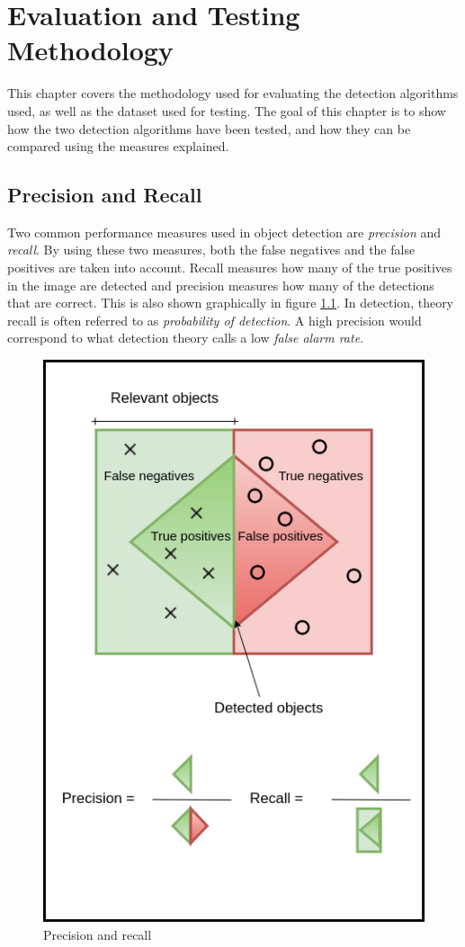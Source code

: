 
\chapter{Evaluation and Testing Methodology}
This chapter covers the methodology used for evaluating the detection algorithms used, as well as the dataset used for testing. The goal of this chapter is to show how the two detection algorithms have been tested, and how they can be compared using the measures explained.

\section{Precision and Recall}
\label{sec:prec_rec}

Two common performance measures used in object detection are \textit{precision} and \textit{recall}. By using these two measures, both the false negatives and the false positives are taken into account. Recall measures how many of the true positives in the image are detected and precision measures how many of the detections that are correct. This is also shown graphically in figure \ref{fig:prec_recall}. In detection, theory recall is often referred to as \textit{probability of detection}. A high precision would correspond to what detection theory calls a low \textit{false alarm rate}.

\begin{figure}[h!]
    \centering
    \includegraphics[scale=0.35]{fig/recall_precision.png}
    \caption{Precision and recall}
    \label{fig:prec_recall}
\end{figure}


